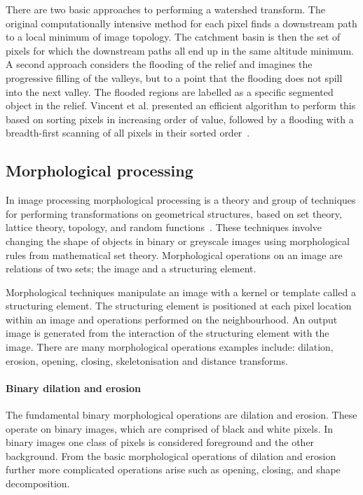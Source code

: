 There are two basic approaches to performing a watershed transform. The original computationally intensive method for each pixel finds a downstream path to a local minimum of image topology. The catchment basin is then the set of pixels for which the downstream paths all end up in the same altitude minimum. A second approach considers the flooding of the relief and imagines the progressive filling of the valleys, but to a point that the flooding does not spill into the next valley. The flooded regions are labelled as a specific segmented object in the relief. Vincent et al. presented an efficient algorithm to perform this based on sorting pixels in increasing order of value, followed by a flooding with a breadth-first scanning of all pixels in their sorted order~\cite{Vincent1991}.

\subsection{Morphological processing}
\label{introduction:image_processing:morphological_processing}
In image processing morphological processing is a theory and group of techniques for performing transformations on geometrical structures, based on set theory, lattice theory, topology, and random functions~\cite{Goutsias2000}. These techniques involve changing the shape of objects in binary or greyscale images using morphological rules from mathematical set theory. Morphological operations on an image are relations of two sets; the image and a structuring element.

Morphological techniques manipulate an image with a kernel or template called a structuring element. The structuring element is positioned at each pixel location within an image and operations performed on the neighbourhood. An output image is generated from the interaction of the structuring element with the image. There are many morphological operations examples include: dilation, erosion, opening, closing, skeletonisation and distance transforms.

\paragraph{Binary dilation and erosion}
The fundamental binary morphological operations are dilation and erosion. These operate on binary images, which are comprised of black and white pixels. In binary images one class of pixels is considered foreground and the other background. From the basic morphological operations of dilation and erosion further more complicated operations arise such as opening, closing, and shape decomposition.

